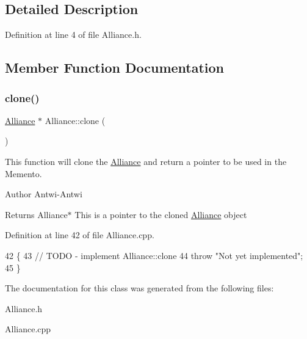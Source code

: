 \subsection{Detailed Description}


Definition at line 4 of file Alliance.\+h.



\subsection{Member Function Documentation}
\mbox{\label{classAlliance_adc67a41223565105889493f9cfd350d0}} 
\subsubsection{\texorpdfstring{clone()}{clone()}}
{\footnotesize\ttfamily \hyperlink{classAlliance}{Alliance} $\ast$ Alliance\+::clone (\begin{DoxyParamCaption}{ }\end{DoxyParamCaption})}



This function will clone the \hyperlink{classAlliance}{Alliance} and return a pointer to be used in the Memento. 

\begin{DoxyAuthor}{Author}
Antwi-\/\+Antwi
\end{DoxyAuthor}
\begin{DoxyReturn}{Returns}
Alliance$\ast$ This is a pointer to the cloned \hyperlink{classAlliance}{Alliance} object 
\end{DoxyReturn}


Definition at line 42 of file Alliance.\+cpp.


\begin{DoxyCode}
42                           \{
43     \textcolor{comment}{// TODO - implement Alliance::clone}
44     \textcolor{keywordflow}{throw} \textcolor{stringliteral}{"Not yet implemented"};
45 \}
\end{DoxyCode}


The documentation for this class was generated from the following files\+:\begin{DoxyCompactItemize}
\item 
Alliance.\+h\item 
Alliance.\+cpp\end{DoxyCompactItemize}
